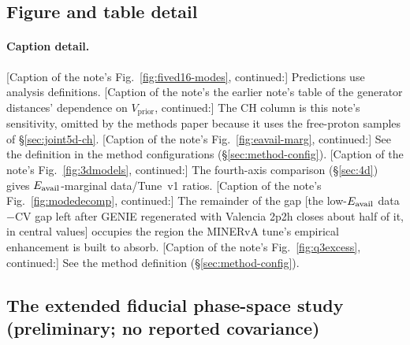 \subsection{Figure and table detail}\label{recsec:higherdim-captions}

\paragraph{Caption detail.} [Caption of the note's Fig.~\ref{fig:fived16-modes}, continued:] Predictions use analysis definitions. [Caption of the note's the earlier note's table of the generator distances' dependence on $V_{\mathrm{prior}}$, continued:] The CH column is this note's sensitivity, omitted by the methods paper because it uses the free-proton samples of \S\ref{sec:joint5d-ch}. [Caption of the note's Fig.~\ref{fig:eavail-marg}, continued:] See the \estPurity{} definition in the method configurations (\S\ref{sec:method-config}). [Caption of the note's Fig.~\ref{fig:3dmodels}, continued:] The fourth-axis comparison (\S\ref{sec:4d}) gives $E_{\mathrm{avail}}$-marginal data/Tune~v1 ratios. [Caption of the note's Fig.~\ref{fig:modedecomp}, continued:] The remainder of the gap [the low-$E_{\mathrm{avail}}$ data$-$CV gap left after GENIE regenerated with Valencia 2p2h closes about half of it, in central values] occupies the region the MINERvA tune's empirical enhancement is built to absorb. [Caption of the note's Fig.~\ref{fig:q3excess}, continued:] See the \estPurity{} method definition (\S\ref{sec:method-config}).

\subsection{The extended fiducial phase-space study (preliminary; no reported covariance)}\label{recsec:higherdim-fps}

